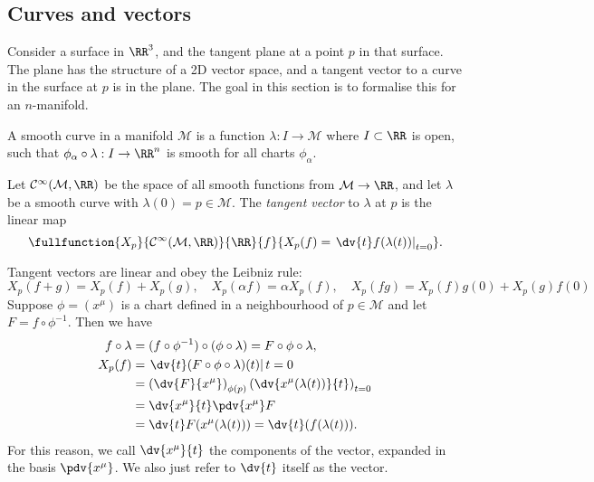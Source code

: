\documentclass{jknotes}
\begin{document}
\subsection{Curves and vectors}
Consider a surface in \(\RR^3\), and the tangent plane at a point \(p\) in that surface. The plane has the structure of a 2D vector space, and a tangent vector to a curve in the surface at \(p\) is in the plane. The goal in this section is to formalise this for an \(n\)-manifold.

\begin{defn}
    A smooth curve in a manifold \(\mathcal{M}\) is a function \(\lambda:I\to\mathcal{M}\) where \(I\subset\RR\) is open, such that \(\phi_\alpha\circ\lambda:I\to\RR^n\) is smooth for all charts \(\phi_\alpha\).
\end{defn}
\begin{defn}
    Let \(\mathcal{C}^\infty(\mathcal{M},\RR)\) be the space of all smooth functions from \(\mathcal{M} \to \RR\), and let \(\lambda\) be a smooth curve with \(\lambda(0) = p \in \mathcal{M}\). The \emph{tangent vector} to \(\lambda\) at \(p\) is the linear map
    \begin{equation}
        \fullfunction{X_p}{\mathcal{C}^\infty(\mathcal{M},\RR)}{\RR}{f}{X_p(f) = \left.\dv{t}f(\lambda(t))\right|_{t=0}}.
    \end{equation}
\end{defn}
Tangent vectors are linear and obey the Leibniz rule:
\begin{equation}
    X_p(f+g) = X_p(f) + X_p(g),\quad X_p(\alpha f) = \alpha X_p(f),\quad X_p(fg) = X_p(f)g(0) + X_p(g)f(0)
\end{equation}
Suppose \(\phi=(x^\mu)\) is a chart defined in a neighbourhood of \(p \in \mathcal{M}\) and let \(F=f\circ\phi^{-1}\). Then we have
\begin{align}
    f\circ \lambda &= (f\circ\phi^{-1}) \circ (\phi\circ\lambda) = F\circ\phi\circ\lambda, \\
    X_p(f) &= \left.\dv{t}(F\circ\phi\circ\lambda)(t)\right|{t=0} \\
           &= \left(\dv{F}{x^\mu}\right)_{\phi(p)} \left(\dv{x^\mu(\lambda(t))}{t}\right)_{t=0} \\
           &= \dv{x^\mu}{t}\pdv{x^\mu} F \\
           &= \dv{t} F(x^\mu(\lambda(t))) = \dv{t}(f(\lambda(t))).
\end{align}
For this reason, we call \(\dv{x^\mu}{t}\) the components of the vector, expanded in the basis \(\pdv{x^\mu}\). We also just refer to \(\dv{t}\) itself as the vector.
\end{document}

